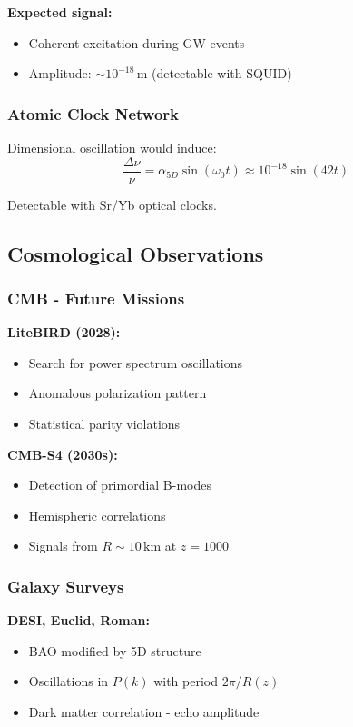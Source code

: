 \documentclass[12pt,a4paper]{article}
\begin{document}
\textbf{Expected signal:}
\begin{itemize}
    \item Coherent excitation during GW events
    \item Amplitude: $\sim 10^{-18}\,\mathrm{m}$ (detectable with SQUID)
\end{itemize}

\subsubsection{Atomic Clock Network}

Dimensional oscillation would induce:
\begin{equation}
\frac{\Delta \nu}{\nu} = \alpha_{5D} \sin(\omega_0 t) \approx 10^{-18} \sin(42t)
\end{equation}

Detectable with Sr/Yb optical clocks.

\subsection{Cosmological Observations}

\subsubsection{CMB - Future Missions}

\textbf{LiteBIRD (2028):}
\begin{itemize}
    \item Search for power spectrum oscillations
    \item Anomalous polarization pattern
    \item Statistical parity violations
\end{itemize}

\textbf{CMB-S4 (2030s):}
\begin{itemize}
    \item Detection of primordial B-modes
    \item Hemispheric correlations
    \item Signals from $R \sim 10\,\mathrm{km}$ at $z=1000$
\end{itemize}

\subsubsection{Galaxy Surveys}

\textbf{DESI, Euclid, Roman:}
\begin{itemize}
    \item BAO modified by 5D structure
    \item Oscillations in $P(k)$ with period $2\pi/R(z)$
    \item Dark matter correlation - echo amplitude
\end{itemize}
\end{document}
